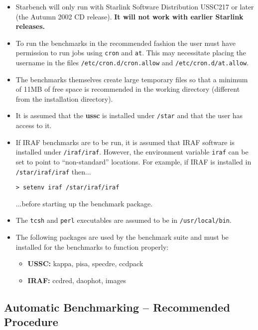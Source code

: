 \begin{itemize}
\item Starbench \pkgver will only run with Starlink Software Distribution
USSC217 or later (the Autumn 2002 CD release). {\bf It will not work
with earlier Starlink releases.} 

\item To run the benchmarks in the recommended fashion the user must
have permission to run jobs using {\tt cron} and {\tt at}. This may
necessitate placing the username in the files {\tt /etc/cron.d/cron.allow}
and {\tt /etc/cron.d/at.allow}.

\item The benchmarks themselves create large temporary files so that a 
minimum of 11MB of free space is recommended in the working directory
(different from the installation directory).

\item It is assumed that the {\bf ussc} is installed under {\tt /star} and
that the user has access to it. 

\item If IRAF benchmarks are to be run, it is
assumed that IRAF software is installed under {\tt /iraf/iraf}. However,
the environment variable {\tt iraf} can be set to point to ``non-standard''
locations. For example, if IRAF is installed in {\tt /star/iraf/iraf} then...

{\tt > setenv iraf /star/iraf/iraf}

...before starting up the benchmark package. 


\item The {\tt tcsh} and {\tt perl} executables are assumed to be in
{\tt /usr/local/bin}.

\item The following packages are used by the benchmark suite and must be 
installed for the benchmarks to function properly:

  \begin{itemize}
    \item {\bf USSC: } kappa, pisa, specdre, ccdpack
    \item {\bf IRAF: } ccdred, daophot, images
  \end{itemize}
\end{itemize}

\subsection{Automatic Benchmarking -- Recommended Procedure}

